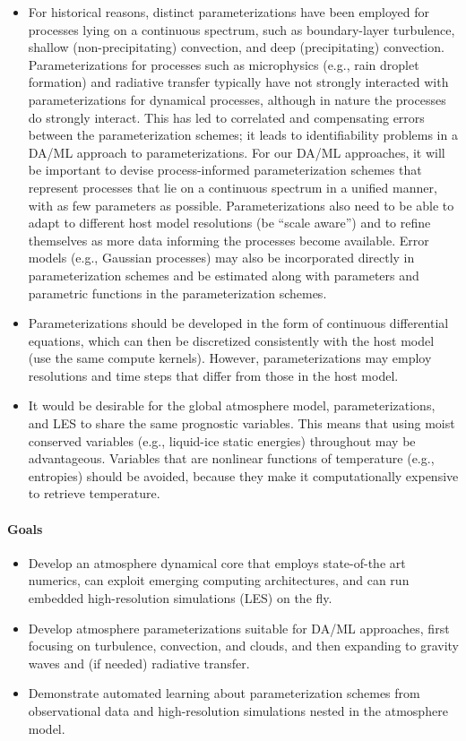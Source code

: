 \documentclass{article}
\begin{document}
\begin{itemize}
    \item For historical reasons, distinct parameterizations have been employed for processes lying on a continuous spectrum, such as boundary-layer turbulence, shallow (non-precipitating) convection, and deep (precipitating) convection. Parameterizations for processes such as microphysics (e.g., rain droplet formation) and radiative transfer typically have not strongly interacted with parameterizations for dynamical processes, although in nature the processes do strongly interact. This has led to correlated and compensating errors between the parameterization schemes; it leads to identifiability problems in a DA/ML approach to parameterizations. For our DA/ML approaches, it will be important to devise process-informed parameterization schemes that represent processes that lie on a continuous spectrum in a unified manner, with as few parameters as possible. Parameterizations also need to be able to adapt to different host model resolutions (be ``scale aware'') and to refine themselves as more data informing the processes become available. Error models (e.g., Gaussian processes) may also be incorporated directly in parameterization schemes and be estimated along with parameters and parametric functions in the parameterization schemes. 
    \item Parameterizations should be developed in the form of continuous differential equations, which can then be discretized consistently with the host model (use the same compute kernels). However, parameterizations may employ resolutions and time steps that differ from those in the host model. 
    \item It would be desirable for the global atmosphere model, parameterizations, and LES to share the same prognostic variables. This means that using moist conserved variables (e.g., liquid-ice static energies) throughout may be advantageous. Variables that are nonlinear functions of temperature (e.g., entropies) should be avoided, because they make it computationally expensive to retrieve temperature.
\end{itemize}

\paragraph{Goals}

\begin{itemize}
    \item Develop an atmosphere dynamical core that employs state-of-the art numerics, can exploit emerging computing architectures, and can run embedded high-resolution simulations (LES) on the fly.
    \item Develop atmosphere parameterizations suitable for DA/ML approaches, first focusing on turbulence, convection, and clouds, and then expanding to gravity waves and (if needed) radiative transfer.
    \item Demonstrate automated learning about parameterization schemes from observational data and high-resolution simulations nested in the atmosphere model.
\end{itemize}
\end{document}
